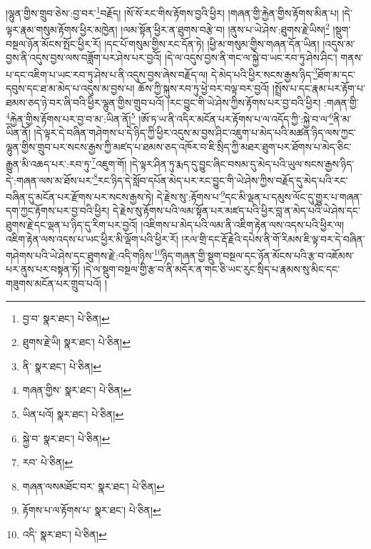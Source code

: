 །ལྷུན་གྱིས་གྲུབ་ཅེས་:བྱ་བར་\footnote{བྱ་བ་  སྣར་ཐང་།  པེ་ཅིན། }བརྗོད། །སོ་སོ་རང་གིས་རྟོགས་བྱའི་ཕྱིར། །གཞན་གྱི་རྐྱེན་གྱིས་རྟོགས་མིན་པ། །དེ་ལྟར་རྣམ་གསུམ་རྟོགས་ཕྱིར་མཁྱེན། །ལམ་སྟོན་ཕྱིར་ན་ཐུགས་བརྩེ་བ། །ནུས་པ་ཡེ་ཤེས་:ཐུགས་རྗེ་ཡིས།\footnote{ཐུགས་རྗེ་ཡི།  སྣར་ཐང་།  པེ་ཅིན། } །སྡུག་བསྔལ་ཉོན་མོངས་སྤོང་ཕྱིར་རོ། །དང་པོ་གསུམ་གྱིས་རང་དོན་ཏེ། །ཕྱི་མ་གསུམ་གྱིས་གཞན་དོན་ཡིན། །འདུས་མ་བྱས་ནི་འདུས་བྱས་ལས་བཟློག་པར་ཤེས་པར་བྱའོ། །དེ་ལ་འདུས་བྱས་ནི་གང་ལ་སྐྱེ་བ་ཡང་རབ་ཏུ་ཤེས་ཤིང་། གནས་པ་དང་འཇིག་པ་ཡང་རབ་ཏུ་ཤེས་པ་ནི་འདུས་བྱས་ཞེས་བརྗོད་ལ། དེ་མེད་པའི་ཕྱིར་སངས་རྒྱས་ཉིད་\footnote{ནི་  སྣར་ཐང་།  པེ་ཅིན། }ཐོག་མ་དང་དབུས་དང་ཐ་མ་མེད་པ་འདུས་མ་བྱས་པ། ཆོས་ཀྱི་སྐུས་རབ་ཏུ་ཕྱེ་བར་བལྟ་བར་བྱའོ། །སྤྲོས་པ་དང་རྣམ་པར་རྟོག་པ་ཐམས་ཅད་ཉེ་བར་ཞི་བའི་ཕྱིར་ལྷུན་གྱིས་གྲུབ་པའོ། །རང་བྱུང་གི་ཡེ་ཤེས་ཀྱིས་རྟོགས་པར་བྱ་བའི་ཕྱིར། :གཞན་གྱི་\footnote{གཞན་གྱིས་  སྣར་ཐང་།  པེ་ཅིན། }རྐྱེན་གྱིས་རྟོགས་པར་བྱ་བ་མ་:ཡིན་ནོ།\footnote{ཡིན་པའོ།  སྣར་ཐང་།  པེ་ཅིན། } །ཨོ་ཏ་ཡ་ནི་འདིར་མངོན་པར་རྟོགས་པ་ལ་འདོད་ཀྱི་:སྐྱེ་བ་ལ་\footnote{སྐྱེ་བ་  སྣར་ཐང་།  པེ་ཅིན། }ནི་མ་ཡིན་ནོ། །དེ་ལྟར་དེ་བཞིན་གཤེགས་པ་དེ་ཉིད་ཀྱི་ཕྱིར་འདུས་མ་བྱས་ཤིང་འཇུག་པ་མེད་པའི་མཚན་ཉིད་ལས་ཀྱང་ལྷུན་གྱིས་གྲུབ་པར་སངས་རྒྱས་ཀྱི་མཛད་པ་ཐམས་ཅད་འཁོར་བ་ཇི་སྲིད་ཀྱི་མཐར་ཐུག་པར་ཐོགས་པ་མེད་ཅིང་རྒྱུན་མི་འཆད་པར་:རབ་ཏུ་\footnote{རབ་  པེ་ཅིན། }འཇུག་གོ། །དེ་ལྟར་ཤིན་ཏུ་རྨད་དུ་བྱུང་ཞིང་བསམ་དུ་མེད་པའི་ཡུལ་སངས་རྒྱས་ཉིད་དེ་:གཞན་ལས་མ་ཐོས་པར་\footnote{གཞན་ལསམཐོང་བར་  སྣར་ཐང་།  པེ་ཅིན། }རང་ཉིད་དེ་སློབ་དཔོན་མེད་པར་རང་བྱུང་གི་ཡེ་ཤེས་ཀྱིས་བརྗོད་དུ་མེད་པའི་རང་བཞིན་དུ་མངོན་པར་རྫོགས་པར་སངས་རྒྱས་ཏེ། དེ་རྗེས་སུ་:རྟོགས་པ་\footnote{རྟོགས་པ་ལ་རྟོགས་པ་  སྣར་ཐང་།  པེ་ཅིན། }དང་མི་ལྡན་པ་དམུས་ལོང་དུ་གྱུར་པ་གཞན་དག་ཀྱང་རྟོགས་པར་བྱ་བའི་ཕྱིར། དེ་རྗེས་སུ་རྟོགས་པའི་ལམ་སྟོན་པར་མཛད་པའི་ཕྱིར་བླ་ན་མེད་པའི་ཡེ་ཤེས་དང་ཐུགས་རྗེ་དང་ལྡན་པ་ཉིད་དུ་རིག་པར་བྱའོ། །འཇིགས་པ་མེད་པའི་ལམ་ནི་འཇིག་རྟེན་ལས་འདས་པའི་ཕྱིར་ལ། འཇིག་རྟེན་ལས་འདས་པ་ཡང་ཕྱིར་མི་ལྡོག་པའི་ཕྱིར་རོ། །རལ་གྲི་དང་རྡོ་རྗེའི་དཔེས་ནི་གོ་རིམས་ཇི་ལྟ་བར་དེ་བཞིན་གཤེགས་པའི་ཡེ་ཤེས་དང་ཐུགས་རྗེ་:འདི་གཉིས་\footnote{འདི་  སྣར་ཐང་།  པེ་ཅིན། }ཉིད་གཞན་གྱི་སྡུག་བསྔལ་དང་ཉོན་མོངས་པའི་རྩ་བ་འཇོམས་པར་ནུས་པར་བསྟན་ཏོ། །དེ་ལ་སྡུག་བསྔལ་གྱི་རྩ་བ་ནི་མདོར་ན་གང་ཅི་ཡང་རུང་སྲིད་པ་རྣམས་སུ་མིང་དང་གཟུགས་མངོན་པར་གྲུབ་པའོ། །
